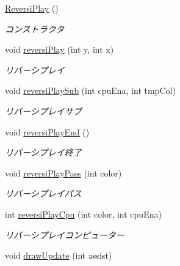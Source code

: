 \begin{DoxyCompactItemize}
\item 
\mbox{\hyperlink{classjp_1_1gr_1_1java__conf_1_1yuta__yoshinaga_1_1reversi_1_1model_1_1_reversi_play_a8244dde6e8abc75432834de7ccb4f52c}{Reversi\+Play}} ()
\begin{DoxyCompactList}\small\item\em コンストラクタ \end{DoxyCompactList}\item 
void \mbox{\hyperlink{classjp_1_1gr_1_1java__conf_1_1yuta__yoshinaga_1_1reversi_1_1model_1_1_reversi_play_ac2fb56755f7f7d7ab0675035e8581ab1}{reversi\+Play}} (int y, int x)
\begin{DoxyCompactList}\small\item\em リバーシプレイ \end{DoxyCompactList}\item 
void \mbox{\hyperlink{classjp_1_1gr_1_1java__conf_1_1yuta__yoshinaga_1_1reversi_1_1model_1_1_reversi_play_a6ea2a343ad2fb3ef1317570e87c3fc4f}{reversi\+Play\+Sub}} (int cpu\+Ena, int tmp\+Col)
\begin{DoxyCompactList}\small\item\em リバーシプレイサブ \end{DoxyCompactList}\item 
void \mbox{\hyperlink{classjp_1_1gr_1_1java__conf_1_1yuta__yoshinaga_1_1reversi_1_1model_1_1_reversi_play_abd208c350d3713ef6872faaa813ac8c3}{reversi\+Play\+End}} ()
\begin{DoxyCompactList}\small\item\em リバーシプレイ終了 \end{DoxyCompactList}\item 
void \mbox{\hyperlink{classjp_1_1gr_1_1java__conf_1_1yuta__yoshinaga_1_1reversi_1_1model_1_1_reversi_play_acf3c99fcbff26d65f7b12f99d69ab88d}{reversi\+Play\+Pass}} (int color)
\begin{DoxyCompactList}\small\item\em リバーシプレイパス \end{DoxyCompactList}\item 
int \mbox{\hyperlink{classjp_1_1gr_1_1java__conf_1_1yuta__yoshinaga_1_1reversi_1_1model_1_1_reversi_play_a1b1b5c91163c374bc2e0bf23ff922617}{reversi\+Play\+Cpu}} (int color, int cpu\+Ena)
\begin{DoxyCompactList}\small\item\em リバーシプレイコンピューター \end{DoxyCompactList}\item 
void \mbox{\hyperlink{classjp_1_1gr_1_1java__conf_1_1yuta__yoshinaga_1_1reversi_1_1model_1_1_reversi_play_a0522dfef43ea5a95aaa2086c22fcefe0}{draw\+Update}} (int assist)

\end{DoxyCompactItemize}
